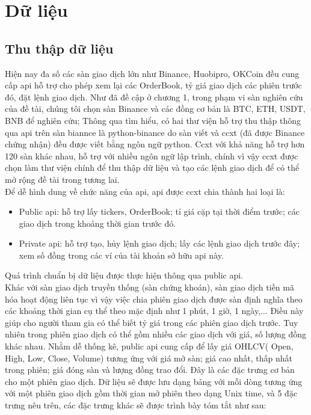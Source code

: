 \chapter{Dữ liệu} \label{chap-Data}

\section{Thu thập dữ liệu}
Hiện nay đa số  các sàn giao dịch lớn như Binance, Huobipro, OKCoin đều cung cấp api hỗ trợ cho phép xem lại các OrderBook, tỷ giá giao dịch các phiên trước đó, đặt lệnh giao dịch. Như đã đề cập ở chương 1, trong phạm vi sàn nghiên cứu của đề tài, chúng tôi chọn sàn Binance và các đồng cơ bản là BTC, ETH, USDT, BNB để nghiên cứu; Thông qua tìm hiểu, có hai thư viện hỗ trợ thu thập thông qua api trên sàn biannce là python-binance do sàn viết và ccxt (đã được Binance chứng nhận) đều được viết bằng ngôn ngữ python. Ccxt với khả năng hỗ trợ hơn 120 sàn khác nhau, hỗ trợ với nhiều ngôn ngữ lập trình, chính vì vậy ccxt được chọn làm thư viện chính để  thu thập dữ liệu và tạo các lệnh giao dịch để có thể mở rộng đề tài trong tương lai.\\
Để dễ hình dung về chức năng của api, api được ccxt chia thành hai loại là:
\begin{itemize}
    \item Public api: hỗ trợ lấy tickers, OrderBook; tỉ giá cặp tại thời điểm trước; các giao dịch trong khoảng thời gian trước đó.
    \item Private api: hỗ trợ tạo, hủy lệnh giao dịch; lấy các lệnh giao dịch trước đây; xem số đồng trong các ví của tài khoản sở hữu api này.
\end{itemize}
Quá trình chuẩn bị dữ liệu được thực hiện thông qua public api.\\
Khác với sàn giao dịch truyền thống (sàn chứng khoán), sàn giao dịch tiền mã hóa hoạt động liên tục vì vậy việc chia phiên giao dịch được sàn định nghĩa theo các khoảng thời gian cụ thể theo mặc định như 1 phút, 1 giờ, 1 ngày,... Điều này giúp cho người tham gia có thể biết tỷ giá trong các phiên giao dịch trước. Tuy nhiên trong phiên giao dịch có thể gồm nhiều các giao dịch với giá, số lượng đồng khác nhau. Nhằm dễ  thống kê, public api cung cấp để lấy giá OHLCV( Open, High, Low, Close, Volume) tương ứng với giá mở sàn; giá cao nhất, thấp nhất trong phiên; giá đóng sàn và lượng đồng trao đổi. Đây là các đặc trưng cơ bản cho một phiên giao dịch. Dữ liệu sẽ được lưu dạng bảng với mỗi dòng tương ứng với một phiên giao dịch gồm thời gian mở phiên theo dạng Unix time, và 5 đặc trưng nêu trên, các đặc trưng khác sẽ được trình bày tóm tắt như sau:
